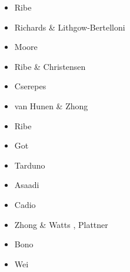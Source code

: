 \begin{itemize}
\begin{scriptsize}
\begin{itemize}
\item[\nineteeneightyeight] Ribe \cite{ribe88}
\item[\nineteenninetysix] Richards \& Lithgow-Bertelloni \cite{rili96}
\item[\nineteenninetyeight] Moore \etal \cite{most98}
\item[\nineteenninetynine] Ribe \& Christensen \cite{rich99}
\item[\twothousand] Cserepes \etal \cite{cscr00} 
\item[\twothousandthree] van Hunen \& Zhong \cite{vazh03}
\item[\twothousandfour] Ribe \cite{ribe04}
\item[\twothousandeight] Got \etal \cite{gomm08}
\item[\twothousandnine] Tarduno \etal \cite{tabs09}
\item[\twothousandeleven] Asaadi \etal \cite{asrs11}
\item[\twothousandtwelve] Cadio \etal \cite{cabp12}
\item[\twothousandthirteen] Zhong \& Watts \cite{zhwa13}, Plattner \etal \cite{plab13}
\item[\twothousandnineteen] Bono \etal \cite{botb19}
\item[\twothousandtwenty] Wei \etal \cite{wesl20}
\end{itemize}
\end{scriptsize}


\end{itemize}
